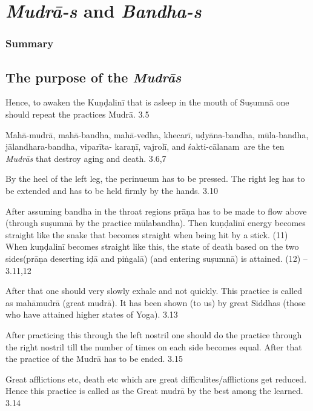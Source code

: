 \chapter{\textit{Mudrā-s} and \textit{Bandha-s}}

\subsection*{Summary}

\section*{The purpose of the \textit{Mudrās}}

Hence, to awaken the Kuṇḍalinī that is asleep in the mouth of Suṣumnā one should repeat the practices Mudrā. 3.5


Mahā-mudrā,  mahā-bandha,  mahā-vedha,  khecarī, uḍyāna-bandha, mūla-bandha, jālandhara-bandha, viparīta- karaṇī, vajrolī, and  śakti-cālanam are the ten \textit{Mudrās} that destroy  aging and death. 3.6,7


By the heel of the left leg, the perinueum has to be pressed. The right leg has to be extended and has to be held firmly by the hands.   3.10

After assuming bandha in the throat regions prāṇa has to be made to flow above (through suṣumnā by the practice  mūlabandha). Then kuṇḍalinī energy becomes straight like the snake that becomes straight when being hit by a stick. (11) When kuṇḍalinī becomes straight like this, the state of death based on the two sides(prāṇa deserting iḍā and piṅgalā) (and entering suṣumnā) is attained. (12) – 3.11,12

After that one should very slowly exhale and not quickly. This practice is called as mahāmudrā (great mudrā). It has been shown (to us) by great Siddhas (those who have attained higher states of Yoga).  3.13

After practicing this through the left nostril one should do the practice through the right nostril till the number of times on each side becomes equal. After that the practice of the Mudrā has to be ended. 3.15


Great afflictions etc, death etc which are great difficulites/afflictions get reduced. Hence this practice is called as the Great mudrā by the best among the learned. 3.14

